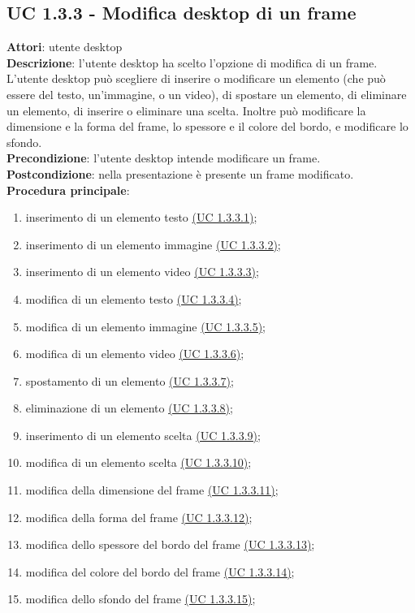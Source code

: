 \subsection{UC 1.3.3 - Modifica desktop di un frame}{
	\label{uc1.3.3}
	\textbf{Attori}: utente desktop \\
	\textbf{Descrizione}: l'utente desktop ha scelto l'opzione di modifica di un frame. L'utente desktop può scegliere di inserire o modificare un elemento (che può essere del testo, un'immagine, o un video), di spostare un elemento, di eliminare un elemento, di inserire o eliminare una scelta. Inoltre può modificare la dimensione e la forma del frame, lo spessore e il colore del bordo, e modificare lo sfondo. \\
	\textbf{Precondizione}: l'utente desktop intende modificare un frame.	\\
	\textbf{Postcondizione}: nella presentazione è presente un frame modificato.	\\
	\textbf{Procedura principale}:
	\begin{enumerate}
		\item inserimento di un elemento testo \hyperref[uc1.3.3.1]{(UC 1.3.3.1)};
		\item inserimento di un elemento immagine \hyperref[uc1.3.3.2]{(UC 1.3.3.2)};
		\item inserimento di un elemento video \hyperref[uc1.3.3.3]{(UC 1.3.3.3)};
		\item modifica di un elemento testo \hyperref[uc1.3.3.4]{(UC 1.3.3.4)};
		\item modifica di un elemento immagine \hyperref[uc1.3.3.5]{(UC 1.3.3.5)};
		\item modifica di un elemento video \hyperref[uc1.3.3.6]{(UC 1.3.3.6)};
		\item spostamento di un elemento \hyperref[uc1.3.3.7]{(UC 1.3.3.7)};
		\item eliminazione di un elemento \hyperref[uc1.3.3.8]{(UC 1.3.3.8)};
		\item inserimento di un elemento scelta \hyperref[uc1.3.3.9]{(UC 1.3.3.9)};
		\item modifica di un elemento scelta \hyperref[uc1.3.3.10]{(UC 1.3.3.10)};
		\item modifica della dimensione del frame \hyperref[uc1.3.3.11]{(UC 1.3.3.11)};
		\item modifica della forma del frame \hyperref[uc1.3.3.12]{(UC 1.3.3.12)};
		\item modifica dello spessore del bordo del frame \hyperref[uc1.3.3.13]{(UC 1.3.3.13)};
		\item modifica del colore del bordo del frame \hyperref[uc1.3.3.14]{(UC 1.3.3.14)};
		\item modifica dello sfondo del frame \hyperref[uc1.3.3.15]{(UC 1.3.3.15)};
	\end{enumerate}
	}
